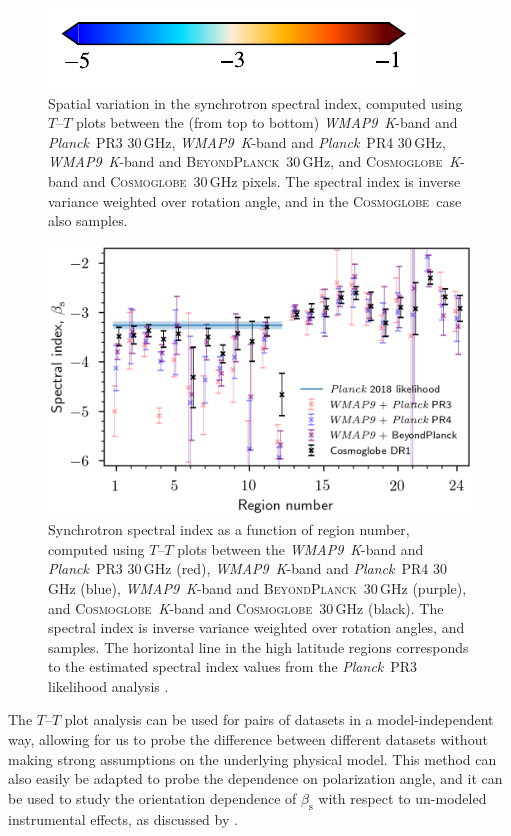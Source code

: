 \documentclass[twocolumn]{../../common/aa}
\def\WMAPnine{\emph{WMAP9}}
\def\Planck{\emph{Planck}}
\newcommand{\BP}{\textsc{BeyondPlanck}}
\newcommand{\Cosmoglobe}{\textsc{Cosmoglobe}}
\newcommand{\K}[0]{\textit K}
\begin{document}
\begin{figure}
	\hspace{0.25cm}\includegraphics{figures/cbar_beta_wide.pdf}
	\caption{Spatial variation in the synchrotron spectral index, computed using $T$--$T$ plots between the (from top to bottom) \WMAPnine\ \K-band and \Planck\ PR3 30\,GHz, \WMAPnine\ \K-band and \Planck\ PR4 30\,GHz, \WMAPnine\ \K-band and \BP\ 30\,GHz, and \Cosmoglobe\ \K-band and \Cosmoglobe\ 30\,GHz pixels. The spectral index is inverse variance weighted over rotation angle, and in the \Cosmoglobe\ case also samples.}
        \label{fig:TT_beta_maps}
\end{figure}
\begin{figure}
        \centering
        \includegraphics[width=\linewidth]{figures/cos30_region_beta_cosmoglobe_vs_wmap_all.png}
        \caption{Synchrotron spectral index as a function of region number, computed using $T$--$T$ plots between the \WMAPnine\ \K-band and \Planck\ PR3 30\,GHz (red), \WMAPnine\ \K-band and \Planck\ PR4 30\,GHz (blue), \WMAPnine\ \K-band and \BP\ 30\,GHz (purple), and \Cosmoglobe\ \K-band and \Cosmoglobe\ 30\,GHz (black). The spectral index is inverse variance weighted over rotation angles, and samples. The horizontal line in the high latitude regions corresponds to the estimated spectral index values from the \Planck\ PR3 likelihood analysis \citep{planck2016-l05}. }
        \label{fig:cos30_beta_region}
\end{figure}

The $T$--$T$ plot analysis can be used for pairs of datasets in a model-independent way, allowing for us to probe the difference between different datasets without making strong assumptions on the underlying physical model. This method can also easily be adapted to probe the dependence on polarization angle, and it can be used to study the orientation dependence of $\beta_\mathrm s$ with respect to un-modeled instrumental effects, as discussed by \citet{wehus:2013}.
\end{document}
